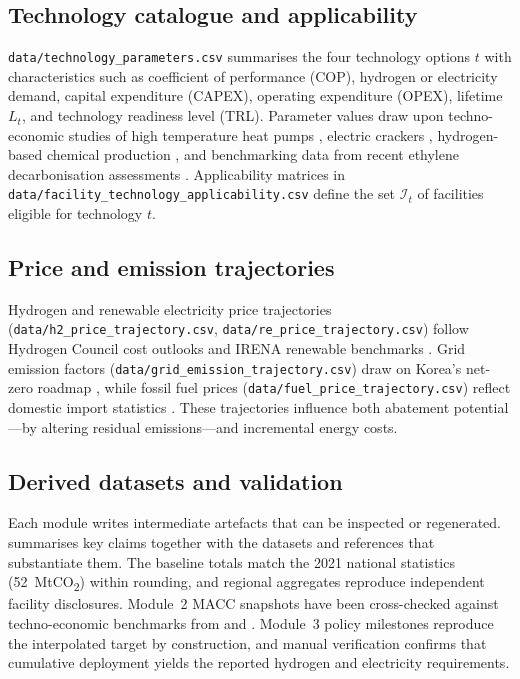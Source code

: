 \documentclass[12pt,a4paper]{article}
\begin{document}
\subsection{Technology catalogue and applicability}

\texttt{data/technology\_parameters.csv} summarises the four technology options $t$ with characteristics such as coefficient of performance (COP), hydrogen or electricity demand, capital expenditure (CAPEX), operating expenditure (OPEX), lifetime $L_t$, and technology readiness level (TRL). Parameter values draw upon techno-economic studies of high temperature heat pumps \citep{Arpagaus2018}, electric crackers \citep{Sadler2020}, hydrogen-based chemical production \citep{Zhang2023}, and benchmarking data from recent ethylene decarbonisation assessments \citep{Woo2025}. Applicability matrices in \texttt{data/facility\_technology\_applicability.csv} define the set $\mathcal{I}_t$ of facilities eligible for technology $t$.

\subsection{Price and emission trajectories}

Hydrogen and renewable electricity price trajectories (\texttt{data/h2\_price\_trajectory.csv}, \texttt{data/re\_price\_trajectory.csv}) follow Hydrogen Council cost outlooks \citep{HydrogenCouncil2021} and IRENA renewable benchmarks \citep{IRENA2023}. Grid emission factors (\texttt{data/grid\_emission\_trajectory.csv}) draw on Korea's net-zero roadmap \citep{IEA2021NetZero}, while fossil fuel prices (\texttt{data/fuel\_price\_trajectory.csv}) reflect domestic import statistics \citep{KEEI2023}. These trajectories influence both abatement potential---by altering residual emissions---and incremental energy costs.

\subsection{Derived datasets and validation}

Each module writes intermediate artefacts that can be inspected or regenerated.  summarises key claims together with the datasets and references that substantiate them. The baseline totals match the 2021 national statistics (52~MtCO\textsubscript{2}) within rounding, and regional aggregates reproduce independent facility disclosures. Module~2 MACC snapshots have been cross-checked against techno-economic benchmarks from \citet{Woo2025} and \citet{Sadler2020}. Module~3 policy milestones reproduce the interpolated target by construction, and manual verification confirms that cumulative deployment yields the reported hydrogen and electricity requirements.
\end{document}
